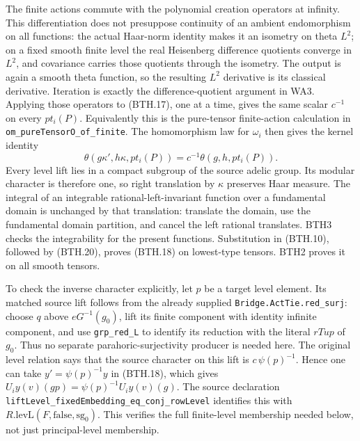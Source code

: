 The finite actions commute with the polynomial creation
operators at infinity.  This differentiation does not
presuppose continuity of an ambient endomorphism on all
functions: the actual Haar-norm identity makes it an isometry
on theta \(L^2\); on a fixed smooth finite level the real
Heisenberg difference quotients converge in \(L^2\), and
covariance carries those quotients through the isometry.
The output is again a smooth theta function, so the resulting
\(L^2\) derivative is its classical derivative.  Iteration is
exactly the difference-quotient argument in WA3.
Applying those operators to
(BTH.17), one at a time, gives the same scalar \(c^{-1}\)
on every \(pt_i(P)\).  Equivalently this is the pure-tensor
finite-action calculation in \texttt{om\_\allowbreak pure\allowbreak Tensor\allowbreak O\_\allowbreak of\_\allowbreak finite}.
The homomorphism law for \(\omega_i\) then gives the kernel
identity
\[
 \theta(g\kappa',h\kappa,pt_i(P))
       =c^{-1}\theta(g,h,pt_i(P)).                              \tag{BTH.20}
\]
Every level lift lies in a compact subgroup of the source
adelic group.  Its modular character is therefore one, so
right translation by \(\kappa\) preserves Haar measure.
The integral of an integrable rational-left-invariant
function over a fundamental domain is unchanged by that
translation: translate the domain, use the fundamental
domain partition, and cancel the left rational translates.
BTH3 checks the integrability for the present functions.
Substitution in (BTH.10), followed by (BTH.20), proves
(BTH.18) on lowest-type tensors.  BTH2 proves it on all
smooth tensors.

To check the inverse character explicitly, let \(p\) be a
target level element.  Its matched source lift follows
from the already supplied \texttt{Bridge.Act\allowbreak Tie.red\_\allowbreak surj}:
choose \(q\) above \(eG^{-1}(g_0)\), lift its finite
component with identity infinite component, and use
\texttt{grp\_\allowbreak red\_\allowbreak L} to identify its reduction with the
literal \(rTup\) of \(g_0\).  Thus no separate
parahoric-surjectivity producer is needed here.
The original level relation says that the source character
on this lift is \(c\,\psi(p)^{-1}\).  Hence one can take
\(y'=\psi(p)^{-1}y\) in (BTH.18), which gives
\(U_i y(v)(gp)=\psi(p)^{-1}U_i y(v)(g)\).
The source declaration
\texttt{lift\allowbreak Level\_\allowbreak fixed\allowbreak Embedding\_\allowbreak eq\_\allowbreak conj\_\allowbreak row\allowbreak Level}
identifies this with \(R.\mathrm{levL}(F,\mathrm{false},
\mathrm{sg}_0)\).  This verifies the full finite-level
membership needed below, not just principal-level membership.

